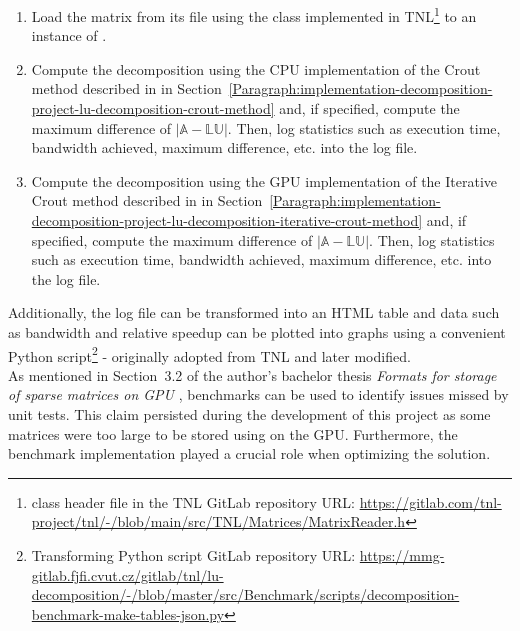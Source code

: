 \begin{enumerate}
	\item Load the matrix from its  file using the  class implemented in TNL\footnote{ class header file in the TNL GitLab repository URL: \url{https://gitlab.com/tnl-project/tnl/-/blob/main/src/TNL/Matrices/MatrixReader.h}} to an instance of .
	\item Compute the decomposition using the CPU implementation of the Crout method described in \textit{} in Section~\ref{Paragraph:implementation-decomposition-project-lu-decomposition-crout-method} and, if specified, compute the maximum difference of $ \left| \mathbb{A} - \mathbb{L}\mathbb{U} \right| $. Then, log statistics such as execution time, bandwidth achieved, maximum difference, etc. into the log file.
	\item Compute the decomposition using the GPU implementation of the Iterative Crout method described in \textit{} in Section~\ref{Paragraph:implementation-decomposition-project-lu-decomposition-iterative-crout-method} and, if specified, compute the maximum difference of $ \left| \mathbb{A} - \mathbb{L}\mathbb{U} \right| $. Then, log statistics such as execution time, bandwidth achieved, maximum difference, etc. into the log file.
\end{enumerate}

Additionally, the log file can be transformed into an HTML table and data such as bandwidth and relative speedup can be plotted into graphs using a convenient Python script\footnote{Transforming Python script GitLab repository URL: \url{https://mmg-gitlab.fjfi.cvut.cz/gitlab/tnl/lu-decomposition/-/blob/master/src/Benchmark/scripts/decomposition-benchmark-make-tables-json.py}} - originally adopted from TNL and later modified. \\
As mentioned in Section~3.2 of the author's bachelor thesis \textit{Formats for storage of sparse matrices on GPU} \cite{Cejka2020}, benchmarks can be used to identify issues missed by unit tests. This claim persisted during the development of this project as some matrices were too large to be stored using  on the GPU. Furthermore, the benchmark implementation played a crucial role when optimizing the solution.



